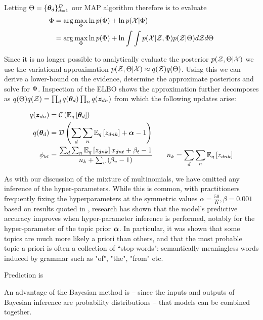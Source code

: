 Letting $\Theta = \{ \thd \}_{d=1}^D$ our MAP algorithm therefore is to evaluate
\begin{align}
\begin{split}
\params 
    &= \arg \max_\params \ln p(\params) + \ln p(\xdat|\params) \\
    &= \arg \max_\params \ln p(\params) + \ln \int \int p(\xdat|\zdat, \Phi)p(\zdat|\Theta) d\zdat d\Theta \label{eqn:vem-lda-problem}
\end{split}
\end{align}

Since it is no longer possible to analytically evaluate the posterior $p(\zdat, \Theta | \xdat)$ we use the variational approximation $p(\zdat, \Theta | \xdat) \approx  q(\zdat)q(\Theta)$. Using this we can derive a lower-bound on the evidence, determine the approximate posteriors and solve for $\params$. Inspection of the ELBO shows the approximation further decomposes as $q(\Theta)q(\zdat) = \prod_d q(\thd)\prod_n q(\zdn)$ from which the following updates arise:

\begin{align}
q(\zdn) & = \cat{\ex{\thd}{q}} \\
q(\thd) &=  \dir{\sum_d \sum_n \ex{\zdnk}{q} + \vv{\alpha} - 1} \\
\phi_{kt} & =
    \frac{
        \sum_d \sum_n \ex{\zdnk}{q}x_{dnt} + \beta_t - 1
    }{
        n_k + \sum_v \left( \beta_v - 1 \right)
    } \qquad n_k = \sum_d \sum_n \ex{z_{dnk}}{q}
\end{align}

As with our discussion of the mixture of multinomials, we have omitted any inference of the hyper-parameters. While this is common, with practitioners frequently fixing the hyperparameters at the symmetric values $\alpha = \frac{50}{K}, \beta=0.001$ based on results quoted in \cite{Griffiths2004}, research has shown\cite{Wallach2009a} that the model's predictive accuracy improves when hyper-parameter inference is performed, notably for the hyper-parameter of the topic prior $\vv{\alpha}$. In particular, it was shown that some topics are much more likely a priori than others, and that the most probable topic a priori is often a collection of ``stop-words": semantically meaningless words induced by grammar such as "of", "the", "from" etc.

Prediction is


An advantage of the Bayesian method is -- since the inputs and outputs of Bayesian inference are probability distributions -- that models can be combined together.

